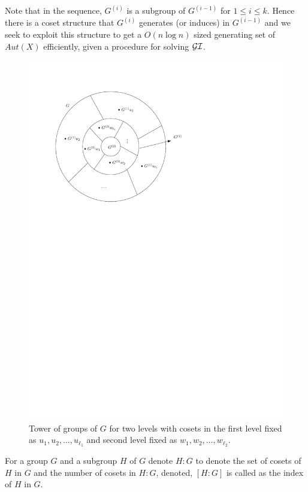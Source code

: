 Note that in the sequence, $G^{(i)}$ is a subgroup of $G^{(i-1)}$ for $ 1 \le i
\le k$. Hence there is a coset structure that $G^{(i)}$ generates (or induces) 
in $G^{(i-1)}$ and we seek to exploit this structure to get a $O(n\log n)$
sized generating set of $Aut(X)$ efficiently, given a procedure for solving 
$\mathcal{GI}$. 
\begin{figure}[htp!]
	\centering
	\includegraphics[scale=0.8]{images/tower}
	\caption{Tower of groups of $G$ for two levels with cosets in the
		first level fixed as $u_1,u_2,\ldots, u_{\ell_1}$ and second
		level fixed as $w_1,w_2,\ldots,w_{\ell_2}$.}
	\label{fig:tower}
\end{figure}

\begin{definition}
	For a group $G$ and a subgroup $H$ of $G$ denote $H:G$ to denote the
	set of cosets of $H$ in $G$ and the number of cosets in $H:G$,
	denoted, $[H:G]$ is called as the index of $H$ in $G$.
\end{definition}

